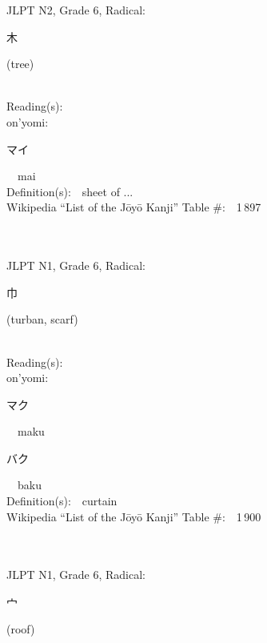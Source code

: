 \begin{multicols}{2}
{JLPT N2, Grade 6, Radical:\ \ {\begin{CJK}{UTF8}{min} 木 \end{CJK}} (tree) } \\
Reading(s):\ \ \\
{\hspace*{1em}}on'yomi:\ \ \\
{\hspace*{2em}}{\begin{CJK}{UTF8}{min} マイ \end{CJK}}\ \ mai\ \ \\
Definition(s):\ \ sheet of ... \\
Wikipedia ``List of the J\=oy\=o Kanji'' Table \#:\ \ 1\,897 \\
\ \ \\
{\fontsize{34pt}{40pt}  }\ \ \\  %
{JLPT N1, Grade 6, Radical:\ \ {\begin{CJK}{UTF8}{min} 巾 \end{CJK}} (turban, scarf) } \\
Reading(s):\ \ \\
{\hspace*{1em}}on'yomi:\ \ \\
{\hspace*{2em}}{\begin{CJK}{UTF8}{min} マク \end{CJK}}\ \ maku\ \ \\
{\hspace*{2em}}{\begin{CJK}{UTF8}{min} バク \end{CJK}}\ \ baku\ \ \\
Definition(s):\ \ curtain \\
Wikipedia ``List of the J\=oy\=o Kanji'' Table \#:\ \ 1\,900 \\
\ \ \\
{\fontsize{34pt}{40pt}  }\ \ \\  %
{JLPT N1, Grade 6, Radical:\ \ {\begin{CJK}{UTF8}{min} 宀 \end{CJK}} (roof) } \\

\end{multicols}
